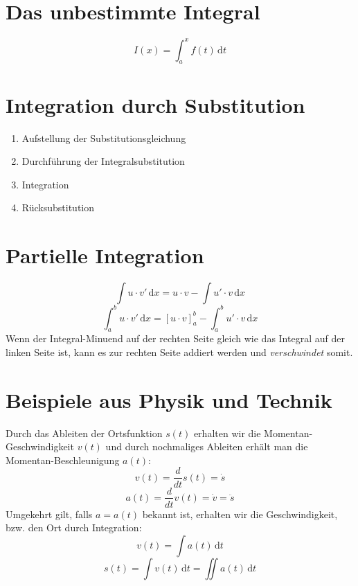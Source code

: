 \section{Das unbestimmte Integral} %
\label{sec:das_unbestimmte_integral}
\[ I(x) = \int_a^x f(t)\,\mathrm{d}t \]

\section{Integration durch Substitution} %
\label{sec:integration_durch_substitution}
\begin{enumerate}
	\item Aufstellung der Substitutionsgleichung
	\item Durchführung der Integralsubstitution
	\item Integration
	\item Rücksubstitution
\end{enumerate}

\section{Partielle Integration} %
\label{sec:partielle_integration}
\[ \int u \cdot v'\,\mathrm{d}x = u \cdot v - \int u' \cdot v\,\mathrm{d}x \]
\[ \int_a^b u \cdot v'\,\mathrm{d}x = [u \cdot v]_a^b - \int_a^b u' \cdot v\,\mathrm{d}x \]
Wenn der Integral-Minuend auf der rechten Seite gleich wie das Integral auf der linken Seite ist, kann es zur rechten Seite addiert werden und \emph{verschwindet} somit.

\section{Beispiele aus Physik und Technik} %
\label{sec:beispiele_aus_physik_und_technik}
Durch das Ableiten der Ortsfunktion \( s(t) \) erhalten wir die Momentan-Geschwindigkeit \(v(t)\) und durch nochmaliges Ableiten erhält man die Momentan-Beschleunigung \(a(t)\):
\[ v(t) = \frac { d }{ dt } s(t) = \dot { s } \]
\[ a(t) = \frac { d }{ dt } v(t) = \dot { v } = \ddot{s}\]
Umgekehrt gilt, falls \( a = a(t) \) bekannt ist, erhalten wir die Geschwindigkeit, bzw. den Ort durch Integration:
\[ v(t) = \int a(t)\,\mathrm{d}t \]
\[ s(t) = \int v(t)\,\mathrm{d}t = \iint a(t)\,\mathrm{d}t\]


